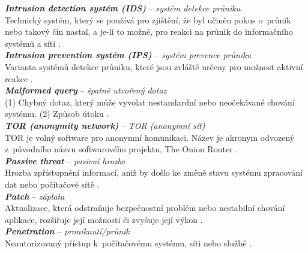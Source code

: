 \textit{\textbf{Intrusion detection systém (IDS)}} -- \textit{systém detekce průniku} \label{app:a:ids} \\ %
Technický systém, který se používá pro zjištění, že byl učiněn pokus o~průnik nebo takový čin nastal, a je-li to možné, pro reakci na průnik do informačního systémů a sítí \cite[str. 114]{Slovnik2015}.  \\

\textit{\textbf{Intrusion prevention systém (IPS)}} -- \textit{systém prevence průniku} \label{app:a:ips} \\ %
Varianta systémů detekce průniku, které jsou zvláště určeny pro možnost aktivní reakce \cite[str. 114]{Slovnik2015}.  \\

\textit{\textbf{Malformed query}} -- \textit{špatně utvořený dotaz} \label{app:a:malformedquery} \\ %
(1) Chybný dotaz, který může vyvolat nestandardní nebo neočekávané chování systému.
(2) Způsob útoku \cite[str. 115]{Slovnik2015}. \\

\textit{\textbf{TOR (anonymity network)}} -- \textit{TOR (anonymní síť)} \label{app:a:tor} \\ %
TOR je volný software pro anonymní komunikaci. Název je akronym odvozený z~původního názvu softwarového projektu, The Onion Router \cite[str. 118]{Slovnik2015}. \\ 

\textit{\textbf{Passive threat}} -- \textit{pasivní hrozba} \label{app:a:passivethreat} \\ %
Hrozba zpřístupnění informací, aniž by došlo ke změně stavu systému zpracování dat nebo počítačové sítě \cite[str. 81]{Slovnik2015}. \\ 

\textit{\textbf{Patch}} -- \textit{záplata} \label{app:a:patch} \\ %
Aktualizace, která odstraňuje bezpečnostní problém nebo nestabilní chování aplikace, \mbox{rozšiřuje} její možnosti či zvyšuje její výkon \cite[str. 133]{Slovnik2015}. \\

\textit{\textbf{Penetration}} -- \textit{proniknutí/průnik} \label{app:a:penetration} \\ %
Neautorizovaný přístup k~počítačovému systému, síti nebo službě \cite[str. 92]{Slovnik2015}. \\

